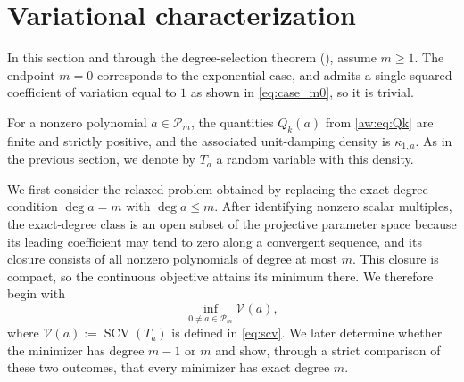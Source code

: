 \documentclass[11pt]{article}
\numberwithin{equation}{section}
\theoremstyle{definition}
\theoremstyle{remark}
\newcommand{\SCV}{\operatorname{SCV}}
\newcommand{\Pcal}{\mathcal P}
\newcommand{\Vcal}{\mathcal V}
\begin{document}
\section{Variational characterization}\label{sec:variational}
In this section and through the degree-selection theorem
(), assume $m\ge1$.
The endpoint $m=0$ corresponds to the exponential case, and admits a single
squared coefficient of variation equal to $1$ as shown in \eqref{eq:case_m0}, so it is trivial.

For a nonzero polynomial $a\in\Pcal_m$, the quantities $Q_k(a)$ from
\eqref{aw:eq:Qk} are finite and strictly positive, and the associated
unit-damping density is $\kappa_{1,a}$. As in the previous section, we denote by $T_a$ a random variable with this density. 


We first consider the relaxed problem obtained by replacing the exact-degree
condition $\deg a=m$ with $\deg a\leq m$. After identifying nonzero scalar
multiples, the exact-degree class is an open subset of the projective
parameter space because its leading coefficient may tend to zero along a
convergent sequence, and its closure consists of all nonzero polynomials of
degree at most $m$. This closure is compact, so the continuous objective
attains its minimum there. We therefore begin with
\begin{equation*}
\inf_{0\ne a\in\Pcal_m}\Vcal(a),
\end{equation*}
where $\Vcal(a):=\SCV(T_a)$ is defined in \eqref{eq:scv}. We later determine whether the minimizer has degree $m-1$ or $m$ and show, through a strict comparison of these two outcomes, that every minimizer has exact degree $m$.
\end{document}
